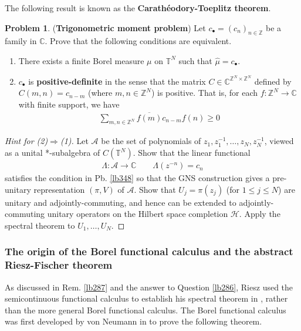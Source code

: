 \documentclass[12pt,b5paper,notitlepage]{article}
\theoremstyle{definition}
\newtheorem{prob}{\color{red}Problem}[section]
\theoremstyle{plain}
\newcommand{\wht}{\widehat}
\newcommand{\ovl}{\overline}
\newcommand{\blt}{\bullet}
\newcommand{\Cbb}{\mathbb C}
\newcommand{\Zbb}{\mathbb Z}
\newcommand{\Tbb}{\mathbb T}
\newcommand{\MH}{\mathcal H}
\newcommand{\SA}{\mathscr A}
\numberwithin{equation}{section}
\begin{document}
The following result is known as the \textbf{Carath\'eodory-Toeplitz theorem}. 

\begin{prob}(\textbf{Trigonometric moment problem})  
Let $c_\blt=(c_n)_{n\in\Zbb}$ be a family in $\Cbb$. Prove that the following conditions are equivalent.
\begin{enumerate}
\item[(1)] There exists a finite Borel measure $\mu$ on $\Tbb^N$ such that $\wht\mu=c_\blt$.
\item[(2)] $c_\blt$ is \textbf{positive-definite} in the sense that the matrix $C\in\Cbb^{\Zbb^N\times\Zbb^N}$ defined by $C(m,n)=c_{n-m}$ (where $m,n\in\Zbb^N$) is positive. That is, for each $f:\Zbb^N\rightarrow\Cbb$ with finite support, we have
\begin{align*}
\sum_{m,n\in\Zbb^N}\ovl{f(m)}c_{n-m}f(n)\geq0
\end{align*}
\end{enumerate}
\end{prob}


\begin{proof}[Hint for (2)$\Rightarrow$(1)]
Let $\SA$ be the set of polynomials of $z_1,z_1^{-1},\dots,z_N,z_N^{-1}$, viewed as a unital *-subalgebra of $C(\Tbb^N)$. Show that the linear functional
\begin{align*}
\Lambda:\SA\rightarrow\Cbb\qquad \Lambda(z^{-n})=c_n
\end{align*}
satisfies the condition in Pb. \ref{lb348} so that the GNS construction gives a pre-unitary representation $(\pi,V)$ of $\SA$. Show that $U_j=\pi(z_j)$ (for $1\leq j\leq N$) are unitary and adjointly-commuting, and hence can be extended to adjointly-commuting unitary operators on the Hilbert space completion $\MH$. Apply the spectral theorem to $U_1,\dots,U_N$. 
\end{proof}





\subsubsection{The origin of the Borel functional calculus and the abstract Riesz-Fischer theorem}\label{lb345}

As discussed in Rem. \ref{lb287} and the answer to Question \ref{lb286}, Riesz used the semicontinuous functional calculus to establish his spectral theorem in \cite{Rie13}, rather than the more general Borel functional calculus. The Borel functional calculus was first developed by von Neumann in \cite{vN31} to prove the following theorem.
\end{document}
